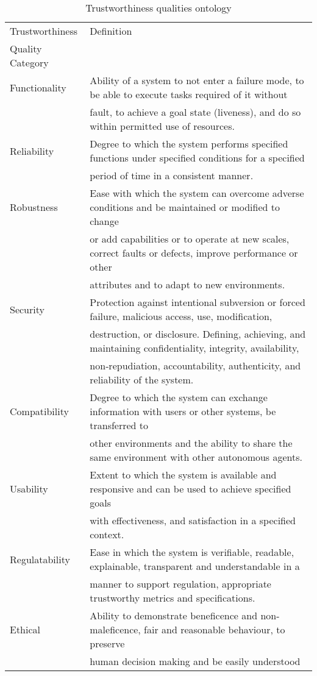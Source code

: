 \begin{table*}[t]
\caption{Trustworthiness qualities ontology}\label{tab:quals}
\centering
\begin{tabular}{ll}
\toprule
Trustworthiness  & Definition                \\ 
Quality Category   &   \\ \midrule

Functionality & Ability of a system to not enter a failure mode, to be able to execute tasks required of it without \\
&fault, to achieve a goal state (liveness), and do so within permitted use of resources.\\

Reliability & Degree to which the system performs specified functions under specified conditions for a specified\\
&period of time in a consistent manner.\\

Robustness & Ease with which the system can overcome adverse conditions and be maintained or modified to change\\
&or add capabilities or to operate at new scales, correct faults or defects, improve performance or other\\
&attributes and to adapt to new environments.\\

Security & Protection against intentional subversion or forced failure, malicious access, use, modification, \\
&destruction, or disclosure. Defining, achieving, and maintaining confidentiality, integrity, availability, \\
&non‐repudiation, accountability, authenticity, and reliability of the system. \\

Compatibility & Degree to which the system can exchange information with users or other systems, be transferred to\\
&other environments and the ability to share the same environment with other autonomous agents.\\

Usability & Extent to which the system is available and responsive and can be used to achieve specified goals\\
&with effectiveness, and satisfaction in a specified context.\\

Regulatability & Ease in which the system is verifiable, readable, explainable, transparent and understandable in a \\
&manner to support regulation, appropriate trustworthy metrics and specifications.\\

Ethical & Ability to demonstrate beneficence and non-maleficence, fair and reasonable behaviour, to preserve\\
&human decision making and be easily understood\\


\bottomrule
\end{tabular}

\label{tab:ontology}
\end{table*}
